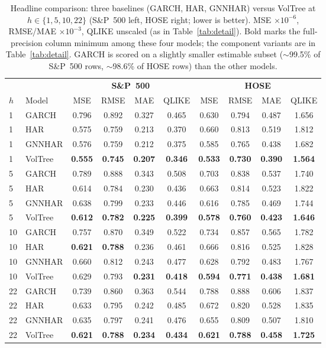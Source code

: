 \documentclass[runningheads,a4paper]{llncs}
\begin{document}
\begin{table}[t]
\centering
\caption{Headline comparison: three baselines (GARCH, HAR, GNNHAR) versus VolTree at
$h\in\{1,5,10,22\}$ (S\&P~500 left, HOSE right; lower is better). MSE $\times10^{-6}$, RMSE/MAE
$\times10^{-3}$, QLIKE unscaled (as in Table~\ref{tab:detail}). Bold marks the full-precision column
minimum among these four models; the component variants are in Table~\ref{tab:detail}. GARCH is scored on a
slightly smaller estimable subset ($\sim$99.5\% of S\&P~500 rows, $\sim$98.6\% of HOSE rows) than the other
models.}
\label{tab:summary}
\scriptsize
\setlength{\tabcolsep}{3pt}
\begin{tabular}{ll cccc cccc}
\toprule
& & \multicolumn{4}{c}{\textbf{S\&P~500}} & \multicolumn{4}{c}{\textbf{HOSE}} \\
\cmidrule(lr){3-6}\cmidrule(lr){7-10}
$h$ & Model & MSE & RMSE & MAE & QLIKE & MSE & RMSE & MAE & QLIKE \\
\midrule
1 & GARCH    & 0.796 & 0.892 & 0.327 & 0.465 & 0.630 & 0.794 & 0.487 & 1.656 \\
1 & HAR      & 0.575 & 0.759 & 0.213 & 0.370 & 0.660 & 0.813 & 0.519 & 1.812 \\
1 & GNNHAR   & 0.576 & 0.759 & 0.212 & 0.375 & 0.585 & 0.765 & 0.438 & 1.682 \\
1 & VolTree & \textbf{0.555} & \textbf{0.745} & \textbf{0.207} & \textbf{0.346} & \textbf{0.533} & \textbf{0.730} & \textbf{0.390} & \textbf{1.564} \\
\midrule
5 & GARCH    & 0.789 & 0.888 & 0.343 & 0.508 & 0.703 & 0.838 & 0.537 & 1.740 \\
5 & HAR      & 0.614 & 0.784 & 0.230 & 0.436 & 0.663 & 0.814 & 0.523 & 1.822 \\
5 & GNNHAR   & 0.638 & 0.799 & 0.233 & 0.446 & 0.616 & 0.785 & 0.469 & 1.744 \\
5 & VolTree & \textbf{0.612} & \textbf{0.782} & \textbf{0.225} & \textbf{0.399} & \textbf{0.578} & \textbf{0.760} & \textbf{0.423} & \textbf{1.646} \\
\midrule
10 & GARCH    & 0.757 & 0.870 & 0.349 & 0.522 & 0.734 & 0.857 & 0.565 & 1.782 \\
10 & HAR      & \textbf{0.621} & \textbf{0.788} & 0.236 & 0.461 & 0.666 & 0.816 & 0.525 & 1.828 \\
10 & GNNHAR   & 0.660 & 0.812 & 0.243 & 0.477 & 0.628 & 0.792 & 0.483 & 1.767 \\
10 & VolTree & 0.629 & 0.793 & \textbf{0.231} & \textbf{0.418} & \textbf{0.594} & \textbf{0.771} & \textbf{0.438} & \textbf{1.681} \\
\midrule
22 & GARCH    & 0.739 & 0.860 & 0.363 & 0.544 & 0.788 & 0.888 & 0.606 & 1.837 \\
22 & HAR      & 0.633 & 0.795 & 0.242 & 0.485 & 0.672 & 0.820 & 0.528 & 1.835 \\
22 & GNNHAR   & 0.635 & 0.797 & 0.241 & 0.476 & 0.655 & 0.809 & 0.507 & 1.810 \\
22 & VolTree & \textbf{0.621} & \textbf{0.788} & \textbf{0.234} & \textbf{0.434} & \textbf{0.621} & \textbf{0.788} & \textbf{0.458} & \textbf{1.725} \\
\bottomrule
\end{tabular}
\end{table}
\end{document}
